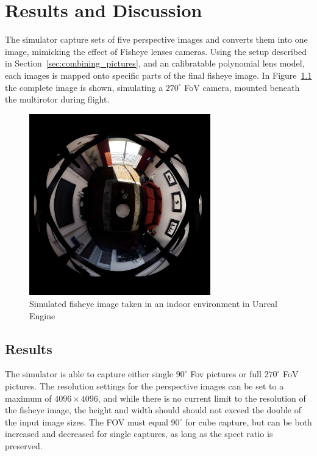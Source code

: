 
\chapter{Results and Discussion}

The simulator capture sets of five perspective images and converts them into one image, mimicking the effect of Fisheye lenses cameras. Using the setup described in Section~\ref{sec:combining_pictures}, and an calibratable polynomial lens model, each images is mapped onto specific parts of the final fisheye image. In Figure~\ref{fig:res_show_fisheye} the complete image is shown, simulating a $270^\circ$ FoV camera, mounted beneath the multirotor during flight. 

\begin{figure}[!htb]
    \centering
    \includegraphics[width=0.7\textwidth]{rapport/fig/Results/1024to2048.png}
    \caption{Simulated fisheye image taken in an indoor environment in Unreal Engine}
    \label{fig:res_show_fisheye}
\end{figure}

\section{Results}

The simulator is able to capture either single $90^\circ$ Fov pictures or full $270^\circ$ FoV pictures. The resolution settings for the perspective images can be set to a maximum of $4096\times4096$, and while there is no current limit to the resolution of the fisheye image, the height and width should should not exceed the double of the input image sizes. The FOV must equal $90^\circ$ for cube capture, but can be both increased and decreased for single captures, as long as the spect ratio is preserved. 


